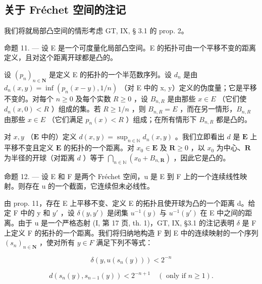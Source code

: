 \subsection{关于 Fréchet 空间的注记}

我们将就局部凸空间的情形考虑 GT, IX, § 3.1 的 prop. 2。

命题 11. --- 设 E 是一个可度量化局部凸空间。E 的拓扑可由一个平移不变的距离定义，且对这个距离开球都是凸的。

设 \((p_{n})_{n\in\mathbf{N}}\) 是定义 E 的拓扑的一个半范数序列。设 \(d_{n}\) 是由 \(d_{n}(x,y)=\inf(p_{n}(x-y),1/n)\) （对 E 中的 x, y）定义的伪度量；它是平移不变的。对每个 \(n\geqslant0\) 及每个实数 \(R\geqslant0\) ，设 \(B_{n,R}\) 是由那些 \(x\in E\) （它们使 \(d_{n}(x,0)<R\) ）组成的集。若 \(R\geqslant1/n\) ，则 \(B_{n,R}=E\) ，而在另一情形，\(B_{n,R}\) 由那些 \(x\in E\) （它们满足 \(p_{n}(x)<R\) ）组成；在所有情形下 \(B_{n,R}\) 都是凸的。

对 \(x, y\) （\(\mathbf{E}\) 中的）定义 \(d(x, y) = \sup_{n \in \mathbb{N}} d_n(x, y)\) 。我们立即看出 \(d\) 是 \(\mathbf{E}\) 上平移不变且定义 \(\mathbf{E}\) 的拓扑的一个距离。对 \(x_0 \in \mathbf{E}\) 及 \(\mathbf{R} \geqslant 0\) ，以 \(x_0\) 为中心、\(\mathbf{R}\) 为半径的开球（对距离 \(d\) ）等于 \(\bigcap_{n \in \mathbb{N}} (x_0 + B_{n,\mathbf{R}})\) ，因此它是凸的。

命题 12. --- 设 E 和 F 是两个 Fréchet 空间，u 是 E 到 F 上的一个连续线性映射。则存在 u 的一个截面，它连续但未必线性。

由 prop. 11，存在 E 上平移不变、定义 E 的拓扑且使开球为凸的一个距离 d。给定 F 中的 y 和 \(y'\) ，设 \(\delta(y, y')\) 是闭集 \(u^{-1}(y)\) 与 \(u^{-1}(y')\) 在 E 中之间的距离。由于 u 是一个严格态射 (I, 第 17 页, th. 1)，GT, IX, §3.1 的注记表明 \(\delta\) 是 F 上定义 F 的拓扑的一个距离。我们将归纳地构造 F 到 E 中的连续映射的一个序列 \((s_n)_{n \in \mathbf{N}}\) ，使对所有 \(y \in F\) 满足下列不等式：

\[
\delta (y, u (s _ {n} (y))) <   2 ^ {- n}\tag{2}
\]

\[
d \left(s _ {n} (y), s _ {n - 1} (y)\right) <   2 ^ {- n + 1} \quad (\text { only   if } n \geqslant 1).\tag{3}
\]

